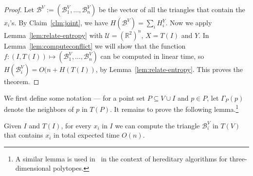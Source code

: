 \documentclass{siamltex}
\newcommand{\cU}{\mathcal{U}}
\newcommand{\R}{\mathbb R}
\newcommand{\tsearch}{\mathcal{B}}
\newcommand{\eqdef}{:=}
\begin{document}
\begin{proof}
Let $\tsearch^V \eqdef (\tsearch_1^V, \ldots, \tsearch_n^V)$ be 
the vector of all 
the triangles that contain the $x_i$'s. By Claim~\ref{clm:joint}, we have
$H(\tsearch^V) = \sum_i H_i^Y$. Now we apply 
Lemma~\ref{lem:relate-entropy} with
$\cU = \left(\R^2\right)^n$, $X = T(I)$ 
and $Y$. In Lemma~\ref{lem:computeconflict} we will show
that the function $f: (I, T(I)) \mapsto (\tsearch^V_1, \ldots, \tsearch^V_n)$ 
can be computed
in linear time, so $H(\tsearch^V_i) = O(n + H(T(I))$, by 
Lemma~\ref{lem:relate-entropy}. 
This proves the theorem.
\end{proof}
\medskip

We first define some notation --- for a point set 
$P \subseteq V \cup I$ and $p \in P$, 
let $\Gamma_P(p)$ denote the neighbors of $p$ in $T(P)$. It 
remains to prove the following lemma.\footnote{A similar
lemma is used in~\cite{ChazelleMu09} in the context of 
hereditary algorithms for three-dimensional polytopes.}
\medskip

\begin{lemma}\label{lem:computeconflict}
Given $I$ and $T(I)$, for every $x_i$ in $I$ we can compute the 
triangle $\tsearch^V_i$ in $T(V)$ that contains $x_i$ 
in total expected time $O(n)$.
\end{lemma}
\end{document}
